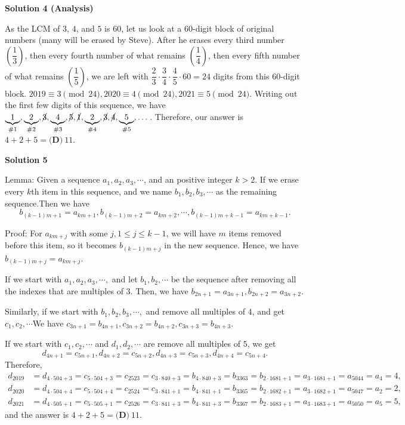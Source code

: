\begin{enumerate}
\textbf{Solution 4 (Analysis)}

As the LCM of $3$, $4$, and $5$ is $60$, let us look at a $60$-digit block of original numbers (many will be erased by Steve). After he erases every third number $\left(\dfrac{1}{3}\right)$, then every fourth number of what remains $\left(\dfrac{1}{4}\right)$, then every fifth number of what remains $\left(\dfrac{1}{5}\right)$, we are left with $\dfrac{2}{3} \cdot \dfrac{3}{4} \cdot \dfrac{4}{5} \cdot 60=24$ digits from this $60$-digit block. $2019 \equiv 3 \pmod {24}, 2020 \equiv 4 \pmod {24}, 2021 \equiv 5 \pmod {24}$. Writing out the first few digits of this sequence, we have $\underbrace{1}_{\#1}, \underbrace{2}_{\#2}, \cancel{3}, \underbrace{4}_{\#3}, \cancel{5}, \cancel{1}, \underbrace{2}_{\#4}, \cancel{3}, \cancel{4}, \underbrace{5}_{\#5}, \dots$. Therefore, our answer is $4+2+5=\boxed{\textbf{(D)}\ 11}$.

 



\textbf{Solution 5}

Lemma: Given a sequence $a_1, a_2, a_3, \cdots$, and an positive integer $k>2$. If we erase every $k$th item in this sequence, and we name $b_1, b_2, b_3, \cdots$ as the remaining sequence.Then we have 
 \[b_{(k-1)m+1}=a_{km+1}, b_{(k-1)m+2}=a_{km+2}, \cdots, b_{(k-1)m+k-1}=a_{km+k-1}.\]

 Proof:  For $a_{km+j}$ with some $j, 1\le j\le k-1$, we will have $m$ items removed before this item, so it becomes $b_{(k-1)m+j}$ in the new sequence. Hence, we have $b_{(k-1)m+j}=a_{km+j}$.

 If we start with $a_1, a_2, a_3, \cdots,$ and let $b_1, b_2, \cdots$ be the sequence after removing all the indexes that are multiples of $3$. Then, we have  $b_{2n+1}=a_{3n+1},b_{2n+2}=a_{3n+2}$.

 Similarly, if we start with $b_1, b_2, b_3, \cdots,$ and remove all multiples of $4$, and get $c_1, c_2, \cdots$We have $c_{3n+1}=b_{4n+1},c_{3n+2}=b_{4n+2},  c_{3n+3}=b_{4n+3}$.

 If we start with $c_1, c_2, \cdots$ and $d_1, d_2, \cdots$ are remove all multiples of $5$, we get 
 \[d_{4n+1}=c_{5n+1}, d_{4n+2}=c_{5n+2}, d_{4n+3}=c_{5n+3}, d_{4n+4}=c_{5n+4}.\]Therefore,
 \begin{align*} d_{2019}&=d_{4\cdot504+3}=c_{5\cdot 504+3}=c_{2523}=c_{3\cdot 840+3}=b_{4\cdot 840+3}=b_{3363}=b_{2\cdot 1681+1}=a_{3\cdot 1681+1}=a_{5044}=a_4=4, \\ d_{2020}&=d_{4\cdot504+4}=c_{5\cdot 504+4}=c_{2524}=c_{3\cdot841+1}=b_{4\cdot841+1}=b_{3365}=b_{2\cdot1682+1}=a_{3\cdot 1682+1}=a_{5047}=a_2=2, \\ d_{2021}&=d_{4\cdot505+1}=c_{5\cdot505+1}=c_{2526}=c_{3\cdot841+3}=b_{4\cdot841+3}=b_{3367}=b_{2\cdot1683+1}=a_{3\cdot1683+1}=a_{5050}=a_5=5, \end{align*}
and the answer is $4+2+5=\boxed{\textbf{(D)}\ 11}$.


\end{enumerate}
